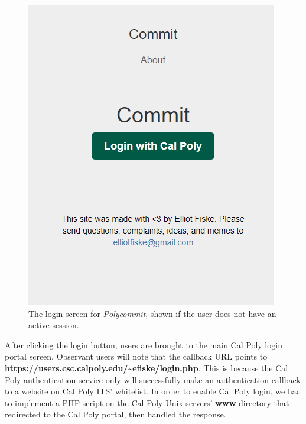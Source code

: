 \begin{figure}[h]
	\includegraphics{figures/onboarding1}
	\caption{The login screen for \textit{Polycommit}, shown if the user does not have an active session.}
	\label{fig:onboarding1}
\end{figure}

\par After clicking the login button, users are brought to the main Cal Poly login portal screen. Observant users will note that the callback URL points to \newline \textbf{https://users.csc.calpoly.edu/\textasciitilde{}efiske/login.php}. This is because the Cal Poly authentication service only will successfully make an authentication callback to a website on Cal Poly ITS' whitelist. In order to enable Cal Poly login, we had to implement a PHP script on the Cal Poly Unix servers' \textbf{www} directory that redirected to the Cal Poly portal, then handled the response.

